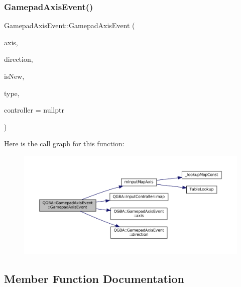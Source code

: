 \subsubsection{\texorpdfstring{Gamepad\+Axis\+Event()}{GamepadAxisEvent()}}
{\footnotesize\ttfamily Gamepad\+Axis\+Event\+::\+Gamepad\+Axis\+Event (\begin{DoxyParamCaption}\item[{\mbox{\hyperlink{ioapi_8h_a787fa3cf048117ba7123753c1e74fcd6}{int}}}]{axis,  }\item[{\mbox{\hyperlink{class_q_g_b_a_1_1_gamepad_axis_event_a5d50ab74dce4e58252f2affb5f227bbc}{Direction}}}]{direction,  }\item[{\mbox{\hyperlink{libretro_8h_a4a26dcae73fb7e1528214a068aca317e}{bool}}}]{is\+New,  }\item[{\mbox{\hyperlink{ioapi_8h_a787fa3cf048117ba7123753c1e74fcd6}{int}}}]{type,  }\item[{\mbox{\hyperlink{class_q_g_b_a_1_1_input_controller}{Input\+Controller}} $\ast$}]{controller = {\ttfamily nullptr} }\end{DoxyParamCaption})}

Here is the call graph for this function\+:
\nopagebreak
\begin{figure}[H]
\begin{center}
\leavevmode
\includegraphics[width=350pt]{class_q_g_b_a_1_1_gamepad_axis_event_a920eb7ca809dc7423c165aaa476f5061_cgraph}
\end{center}
\end{figure}


\subsection{Member Function Documentation}
\mbox{\label{class_q_g_b_a_1_1_gamepad_axis_event_a9f6eb219e344d8added3dbc3867a84fb}} 
